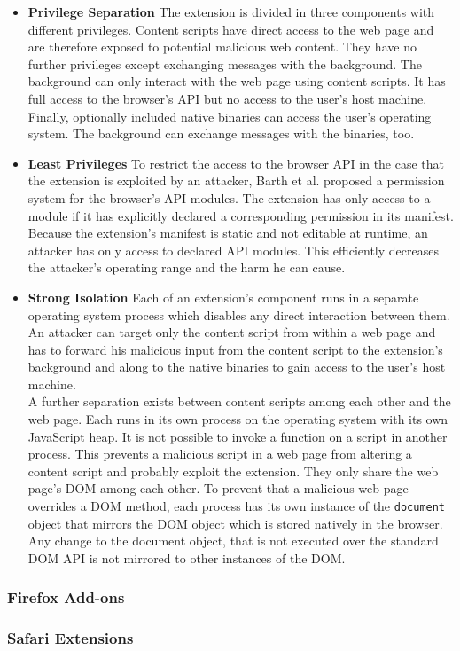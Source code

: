 	\begin{itemize}
		\item \textbf{Privilege Separation} The extension is divided in three components with different privileges. Content scripts have direct access to the web page and are therefore exposed to potential malicious web content. They have no further privileges except exchanging messages with the background. The background can only interact with the web page using content scripts. It has full access to the browser's API but no access to the user's host machine. Finally, optionally included native binaries can access the user's operating system. The background can exchange messages with the binaries, too. 
	
		\item \textbf{Least Privileges} To restrict the access to the browser API in the case that the extension is exploited by an attacker, Barth et al. proposed a permission system for the browser's API modules. The extension has only access to a module if it has explicitly declared a corresponding permission in its manifest. Because the extension's manifest is static and not editable at runtime, an attacker has only access to declared API modules. This efficiently decreases the attacker's operating range and the harm he can cause.
		
		\item \textbf{Strong Isolation} Each of an extension's component runs in a separate operating system process which disables any direct interaction between them. An attacker can target only the content script from within a web page and has to forward his malicious input from the content script to the extension's background and along to the native binaries to gain access to the user's host machine. \\
		A further separation exists between content scripts among each other and the web page. Each runs in its own process on the operating system with its own JavaScript heap. It is not possible to invoke a function on a script in another process. This prevents a malicious script in a web page from altering a content script and probably exploit the extension. They only share the web page's DOM among each other. To prevent that a malicious web page overrides a DOM method, each process has its own instance of the \texttt{document} object that mirrors the DOM object which is stored natively in the browser. Any change to the document object, that is not executed over the standard DOM API is not mirrored to other instances of the DOM.
	\end{itemize}



\subsubsection{Firefox Add-ons}


\subsubsection{Safari Extensions}